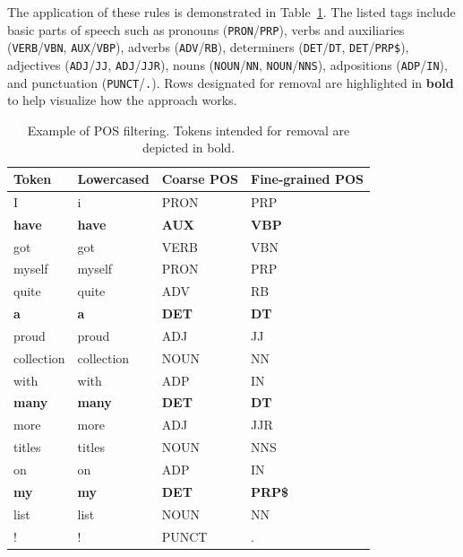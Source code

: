 \documentclass[a4paper,twoside,12pt]{book}
\newcommand{\postag}[1]{\texttt{#1}}
\begin{document}
The application of these rules is demonstrated in Table~\ref{tab:pos-filtering}. The listed tags include basic parts of speech such as pronouns (\postag{PRON}/\postag{PRP}), verbs and auxiliaries (\postag{VERB}/\postag{VBN}, \postag{AUX}/\postag{VBP}), adverbs (\postag{ADV}/\postag{RB}), determiners (\postag{DET}/\postag{DT}, \postag{DET}/\postag{PRP\$}), adjectives (\postag{ADJ}/\postag{JJ}, \postag{ADJ}/\postag{JJR}), nouns (\postag{NOUN}/\postag{NN}, \postag{NOUN}/\postag{NNS}), adpositions (\postag{ADP}/\postag{IN}), and punctuation (\postag{PUNCT}/\postag{.}). Rows designated for removal are highlighted in \textbf{bold} to help visualize how the approach works.

\begin{table}[tbp]%
	\centering
	\caption{Example of POS filtering. Tokens intended for removal are depicted in bold.}
	\label{tab:pos-filtering}
	\begin{tabular}{l l l l}
		\toprule
		Token         & Lowercased    & Coarse POS   & Fine-grained POS \\ \midrule
		I             & i             & PRON         & PRP              \\
		\textbf{have} & \textbf{have} & \textbf{AUX} & \textbf{VBP}     \\
		got           & got           & VERB         & VBN              \\
		myself        & myself        & PRON         & PRP              \\
		quite         & quite         & ADV          & RB               \\
		\textbf{a}    & \textbf{a}    & \textbf{DET} & \textbf{DT}      \\
		proud         & proud         & ADJ          & JJ               \\
		collection    & collection    & NOUN         & NN               \\
		with          & with          & ADP          & IN               \\
		\textbf{many} & \textbf{many} & \textbf{DET} & \textbf{DT}      \\
		more          & more          & ADJ          & JJR              \\
		titles        & titles        & NOUN         & NNS              \\
		on            & on            & ADP          & IN               \\
		\textbf{my}   & \textbf{my}   & \textbf{DET} & \textbf{PRP\$}   \\
		list          & list          & NOUN         & NN               \\
		!             & !             & PUNCT        & .                \\ \bottomrule
	\end{tabular}
\end{table}
\end{document}
